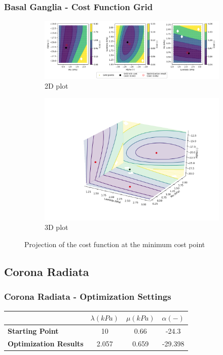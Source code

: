 \documentclass{beamer}
\begin{document}
\begin{frame}
\frametitle{Basal Ganglia - Cost Function Grid}
\begin{figure}[h!]
\centering
\begin{subfigure}[t]{0.6\linewidth}
\centering
\includegraphics[width = 1.\linewidth, trim = 80 00 50 00]
{Pictures/BasalGangliaMinPointProjection}
\caption{2D plot}
\end{subfigure}%
\begin{subfigure}[t]{0.4\linewidth}
\centering
\includegraphics[width = 1.\textwidth, trim = 50 50 80 50]
{Pictures/BasalGangliaMinPointProjection3D}
\caption{3D plot}
\end{subfigure}
\caption{Projection of the cost function at the minimum cost point}
\end{figure}
\end{frame}

\subsection{Corona Radiata}
\begin{frame}
\frametitle{Corona Radiata - Optimization Settings}
	\begin{table}[h!]
	\centering
		\begin{tabular}{lccc}
		\toprule
		& \textbf{$\lambda (kPa)$} & \textbf{$\mu (kPa)$} & \textbf{$\alpha (-)$}\\
		\midrule
		\textbf{Starting Point} & 10 & 0.66 & -24.3 \\
		\textbf{Optimization Results} & 2.057 & 0.659 & -29.398 \\
		\bottomrule
		\end{tabular}
	\end{table}
\end{frame}
\end{document}
